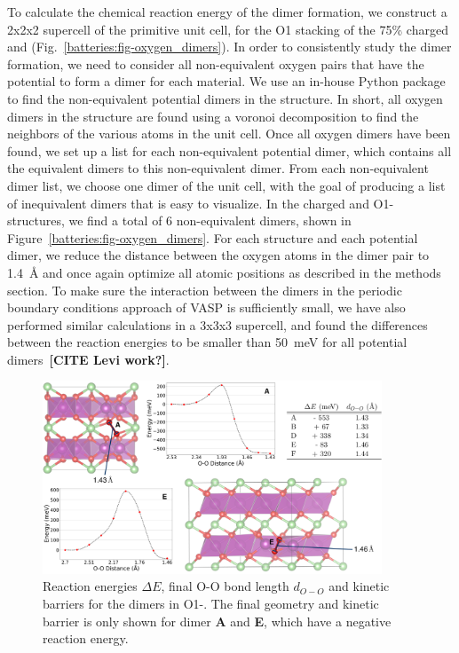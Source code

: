\begin{refsection}
To calculate the chemical reaction energy of the dimer formation, we construct 
a 2x2x2 supercell of the primitive unit cell, for the O1 stacking of the 75\% 
charged  and  
(Fig.~\ref{batteries:fig-oxygen_dimers}). In order to consistently study the 
dimer formation, we need to consider all non-equivalent oxygen pairs that have 
the potential to form a dimer for each material. We use an in-house Python 
package  to find the 
non-equivalent potential dimers in the structure. In short, all oxygen dimers 
in the structure are found using a voronoi decomposition to find the neighbors 
of the various atoms in the unit cell. Once all oxygen dimers have been found, 
we set up a list for each non-equivalent potential dimer, which contains all 
the equivalent dimers to this non-equivalent dimer. From each non-equivalent 
dimer list, we choose one dimer of the unit cell, with the goal of producing a 
list of inequivalent dimers that is easy to visualize. In the charged 
 and O1- structures, we find a total of 6 
non-equivalent dimers, shown in Figure~\ref{batteries:fig-oxygen_dimers}. For 
each structure and each potential dimer, we reduce the distance between the 
oxygen atoms in the dimer pair to 1.4~\si{\angstrom} and once again optimize 
all atomic positions as described in the methods section. To make sure the 
interaction between the dimers in the periodic boundary conditions approach of 
VASP is sufficiently small, we have also performed similar calculations in a 
3x3x3 supercell, and found the differences between the reaction energies to be 
smaller than 50~\si{\milli\electronvolt} for all potential 
dimers~\textbf{[CITE Levi work?]}. 
 
\begin{figure}[h] 
\includegraphics[width=0.9\textwidth]{Figures/batteries/dimer_energetics.png} 
\caption{Reaction energies $\Delta E$, final O-O bond length $d_{O-O}$ and 
kinetic barriers for the dimers in O1-. The final geometry 
and kinetic barrier is only shown for dimer \textbf{A} and \textbf{E}, which 
have a negative reaction energy.} 
\label{batteries:fig-Mn_dimers} 
\end{figure} 
 

\end{refsection}

